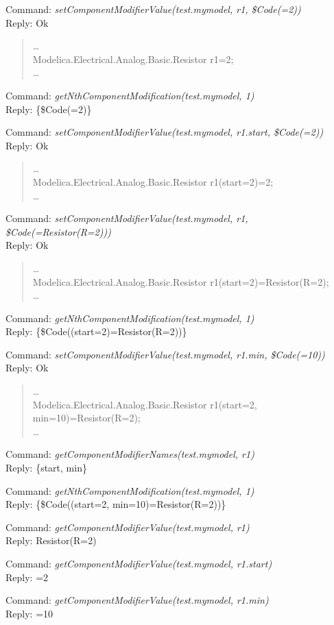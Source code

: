 \documentclass[11pt,a4paper,oneside,english]{book}
\newenvironment{modelicaExamples}{\begin{itemize}}{\end{itemize}}
\newcommand{\command}[1]{Command: \textit{#1}\\}
\newcommand{\reply}[1]{Reply: #1}
\newcommand{\functionex}[2]{\begin{singlespace} \command{#1} \reply{#2} \end{singlespace}}
\newenvironment{mocode}{\begin{verse}\begin{singlespace}\begin{scriptsize}\ttfamily}{\end{scriptsize}\end{singlespace}\end{verse}}
\begin{document}
\begin{modelicaExamples}
			\functionex{setComponentModifierValue(test.mymodel, r1, \$Code(=2))}
			{Ok}

			\begin{mocode}
			\dots \\
			Modelica.Electrical.Analog.Basic.Resistor r1=2;\\
			\dots \\
			\end{mocode}
			\functionex{getNthComponentModification(test.mymodel, 1)}
			{\{\$Code(=2)\}}

			\functionex{setComponentModifierValue(test.mymodel, r1.start, \$Code(=2))}
			{Ok}

			\begin{mocode}
			\dots \\
			Modelica.Electrical.Analog.Basic.Resistor r1(start=2)=2;\\
			\dots \\
			\end{mocode}
			\functionex{setComponentModifierValue(test.mymodel, r1, \$Code(=Resistor(R=2)))}
			{Ok}

			\begin{mocode}
			\dots \\
			Modelica.Electrical.Analog.Basic.Resistor r1(start=2)=Resistor(R=2);\\
			\dots \\
			\end{mocode}
			\functionex{getNthComponentModification(test.mymodel, 1)}
			{\{\$Code((start=2)=Resistor(R=2))\}}

			\functionex{setComponentModifierValue(test.mymodel, r1.min, \$Code(=10))}
			{Ok}

			\begin{mocode}
			\dots \\
			Modelica.Electrical.Analog.Basic.Resistor r1(start=2, min=10)=Resistor(R=2);\\
			\dots \\
			\end{mocode}
			\functionex{getComponentModifierNames(test.mymodel, r1)}
			{\{start, min\}}

			\functionex{getNthComponentModification(test.mymodel, 1)}
			{\{\$Code((start=2, min=10)=Resistor(R=2))\}}

			\functionex{getComponentModifierValue(test.mymodel, r1)}
			{Resistor(R=2)}

			\functionex{getComponentModifierValue(test.mymodel, r1.start)}
			{=2}

			\functionex{getComponentModifierValue(test.mymodel, r1.min)}
			{=10}


\end{modelicaExamples}
\end{document}
